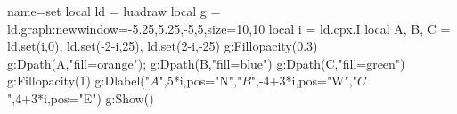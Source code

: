 \begin{luadraw}{name=set}
local ld = luadraw
local g = ld.graph:new{window={-5.25,5.25,-5,5},size={10,10}}
local i = ld.cpx.I
local A, B, C = ld.set(i,0), ld.set(-2-i,25), ld.set(2-i,-25)
g:Fillopacity(0.3)
g:Dpath(A,"fill=orange"); g:Dpath(B,"fill=blue")
g:Dpath(C,"fill=green")
g:Fillopacity(1)
g:Dlabel("$A$",5*i,{pos="N"},"$B$",-4+3*i,{pos="W"},"$C$",4+3*i,{pos="E"})
g:Show()
\end{luadraw}
